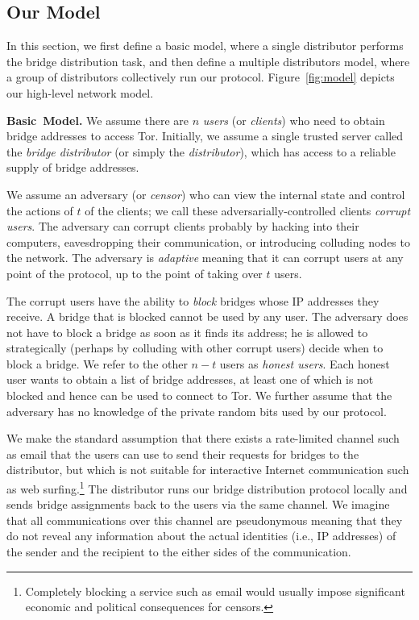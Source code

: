 \documentclass[letterpaper,twocolumn,10pt]{article}
\newcommand{\fullpaper}[1]{#1}
\newcommand{\fullpaper}[1]{}
\newcommand{\sfsize}{\fontsize{0.73\baselineskip}{0.73\baselineskip}\selectfont}
\newcommand{\sans}[1]{\textsf{\sfsize \mbox{#1}}}
\newcommand{\sansb}[1]{\textbf{\sans{\mbox{#1}}}}
\newcommand{\para}[1]{\vspace{0.55em} \noindent \sansb{{\mbox{#1}}}}
\begin{document}
\subsection{Our Model} \label{sec:model}

In this section, we first define a basic model, where a single distributor performs the bridge distribution task, and then define a multiple distributors model, where a group of distributors collectively run our protocol. Figure~\ref{fig:model} depicts our high-level network model.

\para{Basic Model.}
We assume there are $n$ \emph{users} (or \emph{clients}) who need to obtain bridge addresses to access Tor. Initially, we assume a single trusted server called the \emph{bridge distributor} (or simply the \emph{distributor}), which has access to a reliable supply of bridge addresses.%

We assume an adversary (or \emph{censor}) who can view the internal state and control the actions of $t$ of the clients; we call these adversarially-controlled clients \emph{corrupt users}. \fullpaper{The adversary can corrupt clients probably by hacking into their computers, eavesdropping their communication, or introducing colluding nodes to the network.}
The adversary is \emph{adaptive} meaning that it can corrupt users at any point of the protocol, up to the point of taking over $t$ users.

The corrupt users have the ability to \emph{block} bridges whose IP addresses they receive. A bridge that is blocked cannot be used by any user.
The adversary does not have to block a bridge as soon as it finds its address; he is allowed to strategically (perhaps by colluding with other corrupt users) decide when to block a bridge. 
We refer to the other ${n-t}$ users as \emph{honest users}. Each honest user wants to obtain a list of bridge addresses, at least one of which is not blocked and hence can be used to connect to Tor. 
We further assume that the adversary has no knowledge of the private random bits used by our protocol.

We make the standard assumption that there exists a rate-limited channel such as email that the users can use to send their requests for bridges to the distributor, but which is not suitable for interactive Internet communication such as web surfing.\footnote{Completely blocking a service such as email would usually impose significant economic and political consequences for censors.} The distributor runs our bridge distribution protocol locally and sends bridge assignments back to the users via the same channel. \fullpaper{We imagine that all communications over this channel are pseudonymous meaning that they do not reveal any information about the actual identities (i.e., IP addresses) of the sender and the recipient to the either sides of the communication.}
\end{document}
